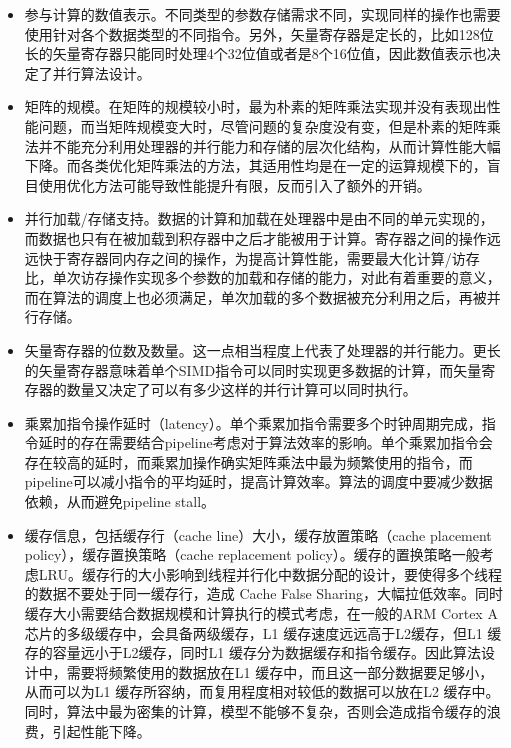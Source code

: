 \begin{itemize}

  \item 参与计算的数值表示。不同类型的参数存储需求不同，实现同样的操作也需要使用针对各个数据类型的不同指令。另外，矢量寄存器是定长的，比如128位长的矢量寄存器只能同时处理4个32位值或者是8个16位值，因此数值表示也决定了并行算法设计。
  \item 矩阵的规模。在矩阵的规模较小时，最为朴素的矩阵乘法实现并没有表现出性能问题，而当矩阵规模变大时，尽管问题的复杂度没有变，但是朴素的矩阵乘法并不能充分利用处理器的并行能力和存储的层次化结构，从而计算性能大幅下降。而各类优化矩阵乘法的方法，其适用性均是在一定的运算规模下的，盲目使用优化方法可能导致性能提升有限，反而引入了额外的开销。
  \item 并行加载/存储支持。数据的计算和加载在处理器中是由不同的单元实现的，而数据也只有在被加载到积存器中之后才能被用于计算。寄存器之间的操作远远快于寄存器同内存之间的操作，为提高计算性能，需要最大化计算/访存比，单次访存操作实现多个参数的加载和存储的能力，对此有着重要的意义，而在算法的调度上也必须满足，单次加载的多个数据被充分利用之后，再被并行存储。
  \item 矢量寄存器的位数及数量。这一点相当程度上代表了处理器的并行能力。更长的矢量寄存器意味着单个SIMD指令可以同时实现更多数据的计算，而矢量寄存器的数量又决定了可以有多少这样的并行计算可以同时执行。
  \item 乘累加指令操作延时（latency）。单个乘累加指令需要多个时钟周期完成，指令延时的存在需要结合pipeline考虑对于算法效率的影响。单个乘累加指令会存在较高的延时，而乘累加操作确实矩阵乘法中最为频繁使用的指令，而pipeline可以减小指令的平均延时，提高计算效率。算法的调度中要减少数据依赖，从而避免pipeline stall。
  \item 缓存信息，包括缓存行（cache line）大小，缓存放置策略（cache placement policy），缓存置换策略（cache replacement policy）。缓存的置换策略一般考虑LRU。缓存行的大小影响到线程并行化中数据分配的设计，要使得多个线程的数据不要处于同一缓存行，造成 Cache False Sharing，大幅拉低效率。同时缓存大小需要结合数据规模和计算执行的模式考虑，在一般的ARM Cortex A 芯片的多级缓存中，会具备两级缓存，L1 缓存速度远远高于L2缓存，但L1 缓存的容量远小于L2缓存，同时L1 缓存分为数据缓存和指令缓存。因此算法设计中，需要将频繁使用的数据放在L1 缓存中，而且这一部分数据要足够小，从而可以为L1 缓存所容纳，而复用程度相对较低的数据可以放在L2 缓存中。同时，算法中最为密集的计算，模型不能够不复杂，否则会造成指令缓存的浪费，引起性能下降。

\end{itemize}

